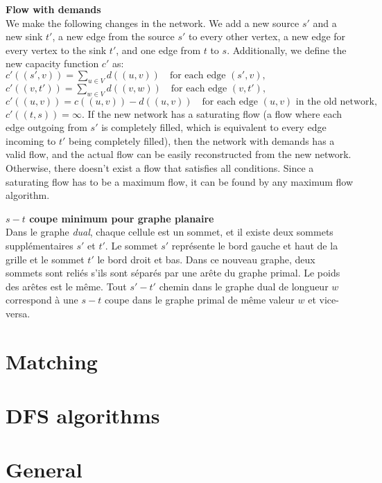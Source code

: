     \textbf{Flow with demands}\\
    We make the following changes in the network. We add a new source $s'$ and a new sink $t'$, a new edge from the source $s'$ to every other vertex, a new edge for every vertex to the sink $t'$, and one edge from $t$ to $s$. Additionally, we define the new capacity function $c'$ as:\newline
    $c'((s', v)) = \sum_{u \in V} d((u, v)) \quad \text{for each edge } (s', v),$\newline
    $c'((v, t')) = \sum_{w \in V} d((v, w)) \quad \text{for each edge } (v, t'),$\newline
    $c'((u, v)) = c((u, v)) - d((u, v)) \quad \text{for each edge } (u, v) \text{ in the old network},$\newline
    $c'((t, s)) = \infty.$\newline
    If the new network has a saturating flow (a flow where each edge outgoing from $s'$ is completely filled, which is equivalent to every edge incoming to $t'$ being completely filled), then the network with demands has a valid flow, and the actual flow can be easily reconstructed from the new network. Otherwise, there doesn't exist a flow that satisfies all conditions. Since a saturating flow has to be a maximum flow, it can be found by any maximum flow algorithm.\newline

    \textbf{$s-t$ coupe minimum pour graphe planaire}\\
    Dans le graphe \emph{dual}, chaque cellule est un sommet, et il existe deux sommets supplémentaires $s'$ et $t'$. Le sommet $s'$ représente le bord gauche et haut de la grille et le sommet $t'$ le bord droit et bas. Dans ce nouveau graphe, deux sommets sont reliés s'ils sont séparés par une arête du graphe primal. Le poids des arêtes est le même.
    Tout $s'-t'$ chemin dans le graphe dual de longueur $w$ correspond à une $s-t$ coupe dans le graphe primal de même valeur $w$ et vice-versa.

\section{Matching}

\section{DFS algorithms}

\section{General}
